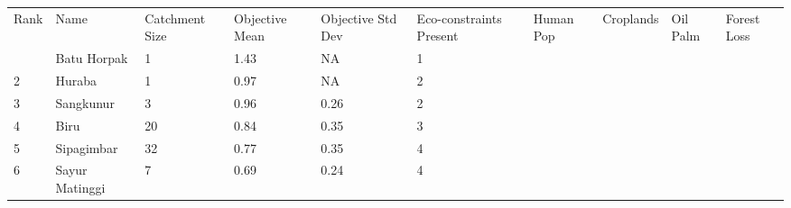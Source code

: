 \begin{table}[ht]
\centering
\begingroup\fontsize{8pt}{9pt}\selectfont
\begin{tabular}{C{0.03\textwidth}C{0.12\textwidth}C{0.09\textwidth}C{0.08\textwidth}C{0.08\textwidth}C{0.08\textwidth}C{0.07\textwidth}C{0.07\textwidth}C{0.07\textwidth}C{0.07\textwidth}}
 Rank & Name & Catchment Size & Objective Mean & Objective Std Dev & Eco-constraints  Present & Human Pop & Croplands & Oil Palm & Forest Loss \\ 
  & Batu Horpak &   1 & \textcolor[HTML]{FFFFFF}{1.43} & \textcolor[HTML]{000000}{  NA} & \textcolor[HTML]{000000}{1} &  &  &  &  \\ 
  {2} & Huraba &   1 & \textcolor[HTML]{000000}{0.97} & \textcolor[HTML]{000000}{  NA} & \textcolor[HTML]{000000}{2} &  &  &  &  \\ 
  {3} & Sangkunur &   3 & \textcolor[HTML]{000000}{0.96} & \textcolor[HTML]{000000}{0.26} & \textcolor[HTML]{000000}{2} &  &  &  &  \\ 
  {4} & Biru &  20 & \textcolor[HTML]{000000}{0.84} & \textcolor[HTML]{FFFFFF}{0.35} & \textcolor[HTML]{000000}{3} &  &  &  &  \\ 
  {5} & Sipagimbar &  32 & \textcolor[HTML]{000000}{0.77} & \textcolor[HTML]{FFFFFF}{0.35} & \textcolor[HTML]{FFFFFF}{4} &  &  &  &  \\ 
  {6} & Sayur Matinggi &   7 & \textcolor[HTML]{000000}{0.69} & \textcolor[HTML]{000000}{0.24} & \textcolor[HTML]{FFFFFF}{4} &  &  &  &  \\ 

\end{tabular}
\end{table}
